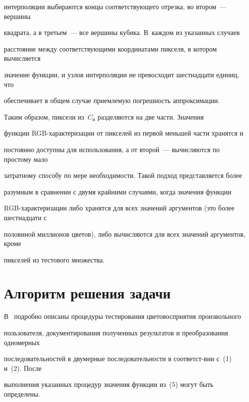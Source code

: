интерполяции выбираются концы соответствующего отрезка, во втором~--- вершины


квадрата, а в третьем~--- все вершины кубика. В~каждом из указанных случаев


расстояние между соответствующими координатами пикселя, в котором вычисляется


значение функции, и узлов интерполяции не превосходит шестнадцати единиц, что


обеспечивает в общем случае приемлемую погрешность аппроксимации.





Таким образом, пиксели из~$C_{\mathrm{и}}$ разделяются на две части. Значения


функции RGB-характеризации от пикселей из первой меньшей части хранятся и


постоянно доступны для использования, а от второй~--- вычисляются по простому мало


затратному способу по мере необходимости. Такой подход представляется более


разумным в сравнении с двумя крайними случаями, когда значения функции


RGB-характеризации либо хранятся для всех значений аргументов (это более шестнадцати с


половиной миллионов цветов), либо вычисляются для всех значений аргументов, кроме


пикселей из тестового множества.





\section{Алгоритм решения задачи}





В~\cite{5-6} подробно описаны процедуры тестирования цветовосприятия произвольного


пользователя, документирования полученных результатов и преобразования одномерных


последовательностей в двумерные последовательности в соответст-\linebreak вии с~(1) и~(2). После


выполнения указанных процедур значения функции из~(5) могут быть определены.





